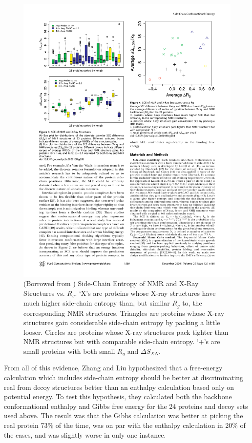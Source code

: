 \begin{figure}[ht]
	\center
	\includegraphics{deltaS_discrimination}
	\caption{(Borrowed from \cite{Zhang:2006p11}) Side-Chain Entropy of NMR and X-Ray Structures vs. $R_g$. `X's are proteins whose X-ray structures have much higher side-chain entropy than, but similar $R_g$ to, the corresponding NMR structures. Triangles are proteins whose X-ray structures gain considerable side-chain entropy by packing a little looser. Circles are proteins whose X-ray structures pack tighter than NMR structures but with comparable side-chain entropy. `+'s are small proteins with both small $R_g$ and $\Delta S_{XN}$.}
	\label{fig:deltaS_discrimination}
\end{figure}

From all of this evidence, Zhang and Liu hypothesized that a free-energy calculation which includes side-chain entropy should be better at discriminating real from decoy structures better than an enthalpy calculation based only on potential energy. To test this hypothesis, they calculated both the backbone conformational enthalpy and Gibbs free energy for the 24 proteins and decoy sets used above. The result was that the Gibbs calculation was better at picking the real protein 73\% of the time, was on par with the enthalpy calculation in 20\% of the cases, and was slightly worse in only one instance.


